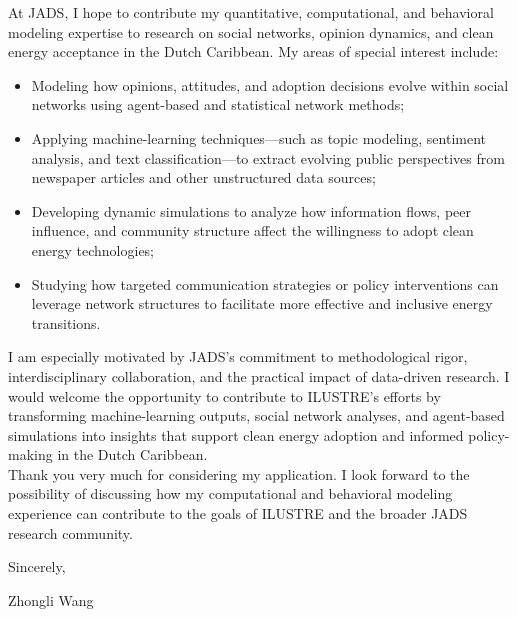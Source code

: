 \documentclass{nfr}
\begin{document}
At JADS, I hope to contribute my quantitative, computational, and behavioral modeling expertise to research on social networks, opinion dynamics, and clean energy acceptance in the Dutch Caribbean. 
My areas of special interest include:
\begin{itemize}
    \item Modeling how opinions, attitudes, and adoption decisions evolve within social networks using agent-based and statistical network methods;
    \item Applying machine-learning techniques—such as topic modeling, sentiment analysis, and text classification—to extract evolving public perspectives from newspaper articles and other unstructured data sources;
    \item Developing dynamic simulations to analyze how information flows, peer influence, and community structure affect the willingness to adopt clean energy technologies;
    \item Studying how targeted communication strategies or policy interventions can leverage network structures to facilitate more effective and inclusive energy transitions.
\end{itemize}

I am especially motivated by JADS’s commitment to methodological rigor, interdisciplinary collaboration, and the practical impact of data-driven research. 
I would welcome the opportunity to contribute to ILUSTRE’s efforts by transforming machine-learning outputs, social network analyses, and agent-based simulations into insights that support clean energy adoption and informed policy-making in the Dutch Caribbean. \\[0.2cm]

Thank you very much for considering my application. I look forward to the possibility of discussing how my computational and behavioral modeling experience can contribute to the goals of ILUSTRE and the broader JADS research community.
\vspace{10mm}

\noindent Sincerely,\\
\vspace{19mm}

\noindent Zhongli Wang

\vspace{10mm}

\end{document}
